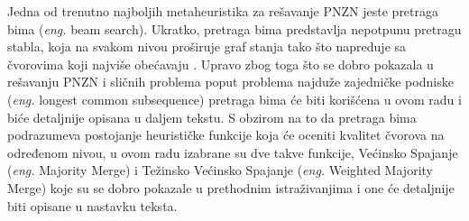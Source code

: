 \documentclass[12pt,oneside]{memoir}
\begin{document}
Jedna od trenutno najboljih metaheuristika za rešavanje PNZN jeste pretraga bima (\textit{eng.} beam search). Ukratko, pretraga
bima predstavlja nepotpunu pretragu stabla, koja na svakom nivou proširuje graf stanja tako što napreduje sa čvorovima koji najviše
obećavaju \cite{SCSBS}. Upravo zbog toga što se dobro pokazala u rešavanju PNZN i sličnih problema poput problema najduže zajedničke podniske
(\textit{eng.} longest common subsequence) pretraga bima će biti korišćena u ovom radu i biće detaljnije opisana u daljem tekstu.
S obzirom na to da pretraga bima podrazumeva postojanje heurističke funkcije koja će oceniti kvalitet čvorova na određenom nivou,
u ovom radu izabrane su dve takve funkcije, Većinsko Spajanje (\textit{eng.} Majority Merge) i Težinsko Većinsko Spajanje
(\textit{eng.} Weighted Majority Merge) koje su se dobro pokazale u prethodnim istraživanjima i one će detaljnije biti 
opisane u nastavku teksta.




\end{document}
